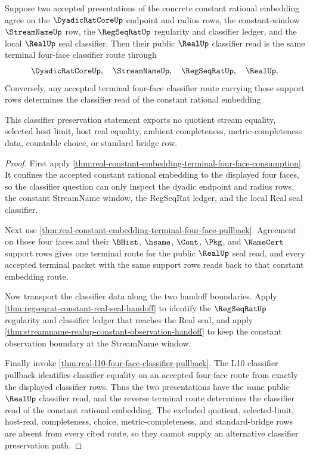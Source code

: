 \begin{theorem}
\label{thm:real-constant-embedding-terminal-four-face-classifier-preservation}
Suppose two accepted presentations of the concrete constant rational embedding
agree on the $\DyadicRatCoreUp$ endpoint and radius rows, the constant-window
$\StreamNameUp$ row, the $\RegSeqRatUp$ regularity and classifier ledger, and
the local $\RealUp$ seal classifier. Then their public $\RealUp$ classifier
read is the same terminal four-face classifier route through
$$
\DyadicRatCoreUp,\quad \StreamNameUp,\quad \RegSeqRatUp,\quad \RealUp.
$$
Conversely, any accepted terminal four-face classifier route carrying those
support rows determines the classifier read of the constant rational embedding.

This classifier preservation statement exports no quotient stream equality,
selected host limit, host real equality, ambient completeness,
metric-completeness data, countable choice, or standard bridge row.
\end{theorem}
\begin{proof}
First apply
\autoref{thm:real-constant-embedding-terminal-four-face-consumption}. It
confines the accepted constant rational embedding to the displayed four faces,
so the classifier question can only inspect the dyadic endpoint and radius
rows, the constant StreamName window, the RegSeqRat ledger, and the local
Real seal classifier.

Next use
\autoref{thm:real-constant-embedding-terminal-four-face-pullback}. Agreement
on those four faces and their $\BHist$, $\hsame$, $\Cont$, $\Pkg$, and
$\NameCert$ support rows gives one terminal route for the public $\RealUp$
seal read, and every accepted terminal packet with the same support rows reads
back to that constant embedding route.

Now transport the classifier data along the two handoff boundaries. Apply
\autoref{thm:regseqrat-constant-real-seal-handoff} to identify the
$\RegSeqRatUp$ regularity and classifier ledger that reaches the Real seal,
and apply \autoref{thm:streamname-realup-constant-observation-handoff} to
keep the constant observation boundary at the StreamName window.

Finally invoke \autoref{thm:real-l10-four-face-classifier-pullback}. The L10
classifier pullback identifies classifier equality on an accepted four-face
route from exactly the displayed classifier rows. Thus the two presentations
have the same public $\RealUp$ classifier read, and the reverse terminal route
determines the classifier read of the constant rational embedding. The
excluded quotient, selected-limit, host-real, completeness, choice,
metric-completeness, and standard-bridge rows are absent from every cited
route, so they cannot supply an alternative classifier preservation path.
\end{proof}

